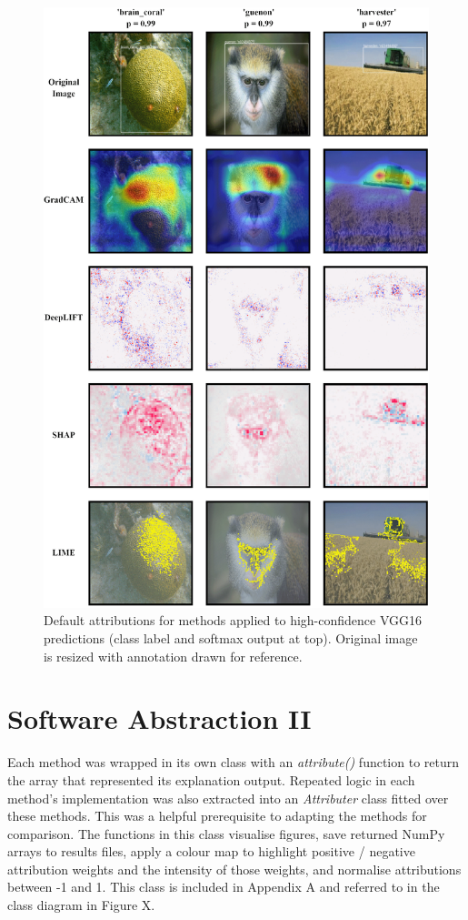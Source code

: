 \documentclass[main]{subfiles}
\begin{document}
\begin{figure}[htbp]
\centering
\includegraphics[scale=0.28]{method_box.png}
\caption{Default attributions for methods applied to high-confidence VGG16 predictions (class label and softmax output at top). Original image is resized with annotation drawn for reference. }
\label{panelimg}
\end{figure}

\section{Software Abstraction II}  \label{sec:sw2}

Each method was wrapped in its own class with an \textit{attribute()} function to return the array that represented its explanation output. Repeated logic in each method's implementation was also extracted into an \textit{Attributer} class fitted over these methods. This was a helpful prerequisite to adapting the methods for comparison. The functions in this class visualise figures, save returned NumPy arrays to results files, apply a colour map to highlight positive / negative attribution weights and the intensity of those weights, and normalise attributions between -1 and 1. This class is included in Appendix A and referred to in the class diagram in Figure X.
\end{document}
